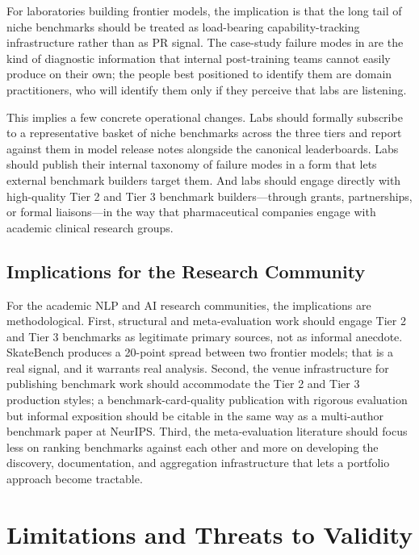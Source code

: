 \documentclass[11pt,a4paper]{article}
\begin{document}
For laboratories building frontier models, the implication is that the long tail of niche benchmarks should be treated as load-bearing capability-tracking infrastructure rather than as PR signal. The case-study failure modes in  are the kind of diagnostic information that internal post-training teams cannot easily produce on their own; the people best positioned to identify them are domain practitioners, who will identify them only if they perceive that labs are listening.

This implies a few concrete operational changes. Labs should formally subscribe to a representative basket of niche benchmarks across the three tiers and report against them in model release notes alongside the canonical leaderboards. Labs should publish their internal taxonomy of failure modes in a form that lets external benchmark builders target them. And labs should engage directly with high-quality Tier 2 and Tier 3 benchmark builders---through grants, partnerships, or formal liaisons---in the way that pharmaceutical companies engage with academic clinical research groups.

\subsection{Implications for the Research Community}
\label{sec:researchimpl}

For the academic NLP and AI research communities, the implications are methodological. First, structural and meta-evaluation work should engage Tier 2 and Tier 3 benchmarks as legitimate primary sources, not as informal anecdote. SkateBench produces a 20-point spread between two frontier models; that is a real signal, and it warrants real analysis. Second, the venue infrastructure for publishing benchmark work should accommodate the Tier 2 and Tier 3 production styles; a benchmark-card-quality publication with rigorous evaluation but informal exposition should be citable in the same way as a multi-author benchmark paper at NeurIPS. Third, the meta-evaluation literature should focus less on ranking benchmarks against each other and more on developing the discovery, documentation, and aggregation infrastructure that lets a portfolio approach become tractable.

\section{Limitations and Threats to Validity}
\label{sec:limitations}
\end{document}
